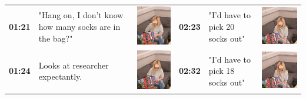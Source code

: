 \documentclass[twocolumn, serif, empirical, authordate]{jote-article}
\begin{document}
\begin{table}[ht!]
\begin{mdframed}[linecolor=jotedark]
\begin{tabularx}{\linewidth}{@{} p{.05\linewidth} p{.28\linewidth} >{\raggedleft\arraybackslash}p{.1\linewidth}  p{.05\linewidth} p{.28\linewidth} >{\raggedleft\arraybackslash}p{.1\linewidth} @{}}
\textbf{01:21} & "Hang on, I don't know how many socks are in the bag?" & \includegraphics[height=.09\textheight, valign=t]{media/image15.png} & 
 \textbf{02:23} & "I'd have to pick 20 socks out" & \includegraphics[height=.09\textheight, valign=t]{media/image23.png} \\ 
 
\textbf{01:24} & Looks at researcher expectantly. & \includegraphics[height=.09\textheight, valign=t]{media/image16.png} &
 \textbf{02:32} & "I'd have to pick 18 socks out" & \includegraphics[height=.09\textheight, valign=t]{media/image24.png} \\ 
 

\end{tabularx}
\end{mdframed}
\end{table}
\end{document}
